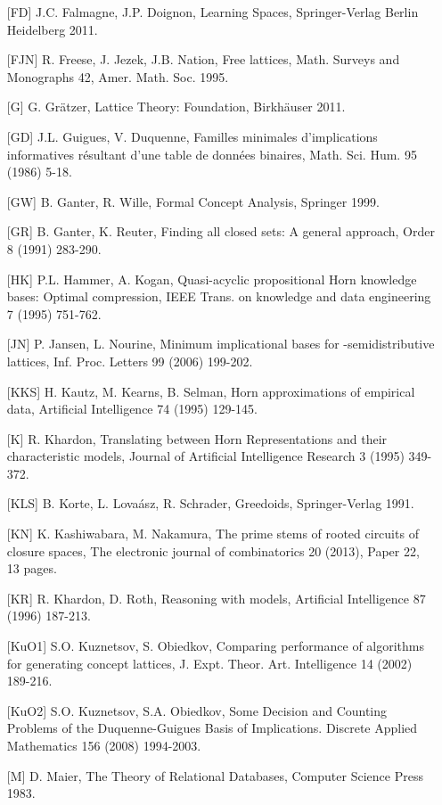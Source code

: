 \documentclass[11pt]{article}
\begin{document}
\begin{enumerate}
\item[{[FD]}] J.C. Falmagne, J.P. Doignon, Learning Spaces, Springer-Verlag Berlin Heidelberg 2011.
\item[{[FJN]}] R. Freese, J. Jezek, J.B. Nation, Free lattices, Math. Surveys and Monographs 42, Amer. Math. Soc. 1995.
\item[{[G]}] G. Gr\"{a}tzer, Lattice Theory: Foundation, Birkh\"{a}user 2011.
\item[{[GD]}] J.L. Guigues, V. Duquenne, Familles minimales d'implications informatives r\'{e}sultant d'une table de donn\'{e}es binaires, Math. Sci. Hum. 95 (1986) 5-18.
\item[{[GW]}] B. Ganter, R. Wille, Formal Concept Analysis, Springer 1999.
	\item[{[GR]}] B. Ganter, K. Reuter, Finding all closed sets: A general approach, Order 8 (1991) 283-290.
\item[{[HK]}] P.L. Hammer, A. Kogan, Quasi-acyclic propositional Horn knowledge bases: Optimal compression, IEEE Trans. on knowledge and data engineering 7 (1995) 751-762.
\item[{[JN]}] P. Jansen, L. Nourine, Minimum implicational bases for -semidistributive lattices, Inf. Proc. Letters 99 (2006) 199-202.
\item[{[KKS]}] H. Kautz, M. Kearns, B. Selman, Horn approximations of empirical data, Artificial Intelligence 74 (1995) 129-145.
\item[{[K]}] R. Khardon, Translating between Horn Representations and their characteristic models, Journal of Artificial Intelligence Research 3 (1995) 349-372.
\item[{[KLS]}] B. Korte, L. Lova\'{a}sz, R. Schrader, Greedoids, Springer-Verlag 1991.
\item[{[KN]}] K. Kashiwabara, M. Nakamura, The prime stems of rooted circuits of closure spaces, The electronic journal of combinatorics 20 (2013), Paper 22, 13 pages.
\item[{[KR]}] R. Khardon, D. Roth, Reasoning with models, Artificial Intelligence 87 (1996) 187-213.
\item[{[KuO1]}] S.O. Kuznetsov, S. Obiedkov, Comparing performance of algorithms for generating concept lattices, J. Expt. Theor. Art. Intelligence 14 (2002) 189-216.
\item[{[KuO2]}] S.O. Kuznetsov, S.A. Obiedkov, Some Decision and Counting Problems of the Duquenne-Guigues Basis of Implications. Discrete Applied Mathematics 156 (2008) 1994-2003.
\item[{[M]}] D. Maier, The Theory of Relational Databases, Computer Science Press 1983.

\end{enumerate}
\end{document}
